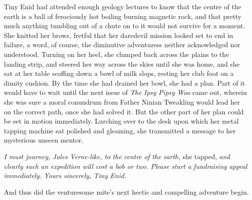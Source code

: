 Tiny Enid had attended enough geology lectures to know that the centre of the earth is a ball of ferociously hot boiling burning magnetic rock, and that pretty much anything tumbling out of a chute on to it would not survive for a moment. She knitted her brows, fretful that her daredevil mission looked set to end in failure, a word, of course, the diminutive adventuress neither acknowledged nor understood. Turning on her heel, she clumped back across the plains to the landing strip, and steered her way across the skies until she was home, and she sat at her table scoffing down a bowl of milk slops, resting her club foot on a dimity cushion. By the time she had drained her bowl, she had a plan. Part of it would have to wait until the next issue of \emph{The Ipsy Pipsy Woo} came out, wherein she was sure a moral conundrum from Father Ninian Tweakling would lead her on the correct path, once she had solved it. But the other part of her plan could be set in motion immediately. Lurching over to the desk upon which her metal tapping machine sat polished and gleaming, she transmitted a message to her mysterious unseen mentor.

\emph{I must journey, Jules Verne-like, to the centre of the earth,} she tapped, \emph{and clearly such an expedition will cost a bob or two. Please start a fundraising appeal immediately. Yours sincerely, Tiny Enid.}


And thus did the venturesome mite's next hectic and compelling adventure begin.